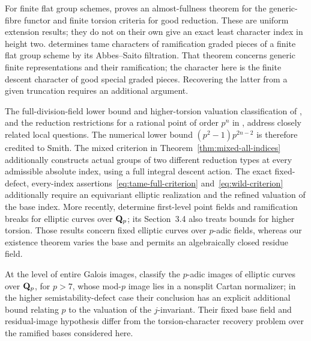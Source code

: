 For finite flat group schemes, \citet[Theorems~A--B, p.~661]{Bondarko2006} proves an almost-fullness theorem for the generic-fibre functor and finite torsion criteria for good reduction. These are uniform extension results; they do not on their own give an exact least character index in height two. \citet[Theorem~1.1, p.~1 of the preprint]{Hattori2008} determines tame characters of ramification graded pieces of a finite flat group scheme by its Abbes--Saito filtration. That theorem concerns generic finite representations and their ramification; the character here is the finite descent character of good special graded pieces. Recovering the latter from a given truncation requires an additional argument.

The full-division-field lower bound and higher-torsion valuation classification of \citet[Theorem~1.1, p.~2; Theorem~4.4 and Corollaries~4.5--4.6, pp.~10--11 of the author version]{Smith2023}, and the reduction restrictions for a rational point of order $p^n$ in \citet[Theorems~1.1--1.3, pp.~1--2]{Melistas2022}, address closely related local questions. The numerical lower bound $(p^2-1)p^{2n-2}$ is therefore credited to Smith. The mixed criterion in Theorem~\ref{thm:mixed-all-indices} additionally constructs actual groups of two different reduction types at every admissible absolute index, using a full integral descent action. The exact fixed-defect, every-index assertions~\eqref{eq:tame-full-criterion} and~\eqref{eq:wild-criterion} additionally require an equivariant elliptic realization and the refined valuation of the base index. More recently, \citet{OzekiYoshida2026} determine first-level point fields and ramification breaks for elliptic curves over $\mathbf Q_p$; its Section~3.4 also treats bounds for higher torsion. Those results concern fixed elliptic curves over $p$-adic fields, whereas our existence theorem varies the base and permits an algebraically closed residue field.

At the level of entire Galois images, \citet[Theorem~1.3, p.~2]{BisattEtAl2026} classify the $p$-adic images of elliptic curves over $\mathbf Q_p$, for $p>7$, whose mod-$p$ image lies in a nonsplit Cartan normalizer; in the higher semistability-defect case their conclusion has an explicit additional bound relating $p$ to the valuation of the $j$-invariant. Their fixed base field and residual-image hypothesis differ from the torsion-character recovery problem over the ramified bases considered here.

